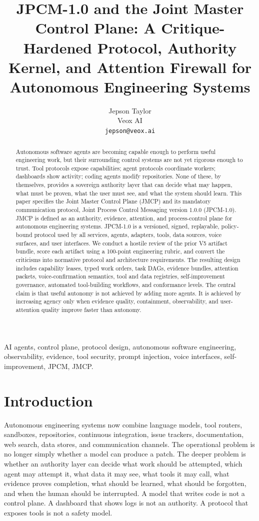 \documentclass[journal,onecolumn]{IEEEtran}
\title{JPCM-1.0 and the Joint Master Control Plane: A Critique-Hardened Protocol, Authority Kernel, and Attention Firewall for Autonomous Engineering Systems}
\author{Jepson Taylor\\Veox AI\\\texttt{jepson@veox.ai}}
\begin{document}
\maketitle
\begin{abstract}
Autonomous software agents are becoming capable enough to perform useful engineering work, but their surrounding control systems are not yet rigorous enough to trust. Tool protocols expose capabilities; agent protocols coordinate workers; dashboards show activity; coding agents modify repositories. None of these, by themselves, provides a sovereign authority layer that can decide what may happen, what must be proven, what the user must see, and what the system should learn. This paper specifies the Joint Master Control Plane (JMCP) and its mandatory communication protocol, Joint Process Control Messaging version 1.0.0 (JPCM-1.0). JMCP is defined as an authority, evidence, attention, and process-control plane for autonomous engineering systems. JPCM-1.0 is a versioned, signed, replayable, policy-bound protocol used by all services, agents, adapters, tools, data sources, voice surfaces, and user interfaces. We conduct a hostile review of the prior V5 artifact bundle, score each artifact using a 100-point engineering rubric, and convert the criticisms into normative protocol and architecture requirements. The resulting design includes capability leases, typed work orders, task DAGs, evidence bundles, attention packets, voice-confirmation semantics, tool and data registries, self-improvement governance, automated tool-building workflows, and conformance levels. The central claim is that useful autonomy is not achieved by adding more agents. It is achieved by increasing agency only when evidence quality, containment, observability, and user-attention quality improve faster than autonomy.
\end{abstract}
\begin{IEEEkeywords}
AI agents, control plane, protocol design, autonomous software engineering, observability, evidence, tool security, prompt injection, voice interfaces, self-improvement, JPCM, JMCP.
\end{IEEEkeywords}

\section{Introduction}
Autonomous engineering systems now combine language models, tool routers, sandboxes, repositories, continuous integration, issue trackers, documentation, web search, data stores, and communication channels. The operational problem is no longer simply whether a model can produce a patch. The deeper problem is whether an authority layer can decide what work should be attempted, which agent may attempt it, what data it may see, what tools it may call, what evidence proves completion, what should be learned, what should be forgotten, and when the human should be interrupted. A model that writes code is not a control plane. A dashboard that shows logs is not an authority. A protocol that exposes tools is not a safety model.
\end{document}
